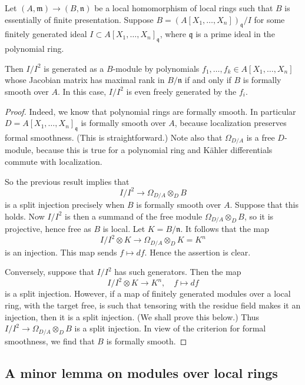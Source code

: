 \begin{proposition} 
Let $(A, \mathfrak{m}) \to (B, \mathfrak{n})$ be a local homomorphism of local
rings such that $B$ is essentially of finite presentation.
Suppose $B = (A[X_1, \dots, X_n])_{\mathfrak{q}}/I$ for some finitely generated
ideal $I \subset A[X_1, \dots, X_n]_{\mathfrak{q}}$, where $\mathfrak{q}$ is a
prime ideal in the polynomial ring.

Then $I/I^2$ is generated as a $B$-module by polynomials
$f_1, \dots, f_k \in A[X_1, \dots, X_n]$ whose Jacobian matrix has maximal rank
in $B/\mathfrak{n}$ if and only if $B$ is formally smooth over $A$.
In this case, $I/I^2$ is even freely generated by the $f_i$.
\end{proposition} 
\begin{proof} 
Indeed, we know that polynomial rings are formally smooth. 
In particular $D = A[X_1, \dots, X_n]_{\mathfrak{q}}$ is formally smooth over
$A$, because localization preserves formal smoothness. (This is
straightforward.) Note also that $\Omega_{D/A}$ is a free $D$-module, because
this is true for a polynomial ring and K\"ahler differentials commute with
localization.

So the previous result implies that
\[ I/I^2 \to \Omega_{D/A} \otimes_D B  \]
is a split injection precisely when $B$ is formally smooth over $A$. Suppose
that this holds.
Now $I/I^2$ is then a summand of the free module $\Omega_{D/A} \otimes_D B$, so it
is projective, hence free as $B$ is local.
Let $K = B/\mathfrak{n}$. It follows that the map
\[ I/I^2 \otimes K \to \Omega_{D/A} \otimes_D  K = K^n \]
is an injection. This map sends $f \mapsto df$. Hence the assertion is clear.

Conversely, suppose that $I/I^2$ has such generators. 
Then the map 
\[ I/I^2 \otimes K \to K^n, \quad f\mapsto df  \]
is a split injection. 
However, if a map of finitely generated modules over a local ring, with the
target free, is such that tensoring with
the residue field makes it an injection, then it is a split injection. (We
shall prove this below.) Thus $I/I^2 \to \Omega_{D/A} \otimes_D B$ is a split
injection. In view
of the criterion for formal smoothness, we find that $B$ is formally smooth.
\end{proof} 

\subsection{A minor lemma on modules over local rings}

